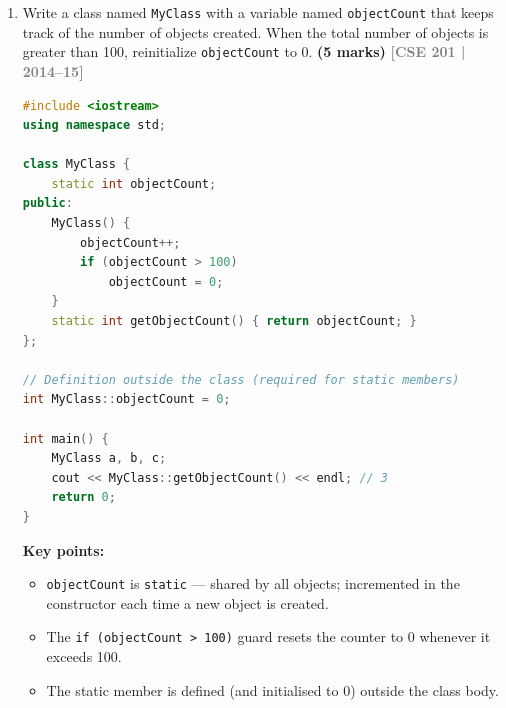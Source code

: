 \documentclass[12pt,a3paper]{article}
\newcommand{\yr}[1]{\hfill\textcolor{gray}{\small\textbf{[#1]}}}
\newcommand{\mk}[1]{\textcolor{orange!70!black}{\small\textbf{(#1 marks)}}}
\begin{document}
\begin{enumerate}
\begin{tcolorbox}[enhanced,breakable,ansbox,colback=cB!4,colframe=cB,
  boxrule=0.8pt,arc=5pt,
  title={\textbf{Answer}},fonttitle=\bfseries\color{white},colbacktitle=cB]
\textbf{Rules for static methods:}
\begin{itemize}[itemsep=2pt]
  \item Can access only \emph{static} members (no access to
    \texttt{this} pointer or non-static members).
  \item Can be called without creating an object:
    \texttt{ClassName::method()}.
  \item Cannot be \texttt{virtual} or \texttt{const}.
\end{itemize}

\begin{lstlisting}[language=C++]
class Counter {
    static int count;       // declaration
public:
    Counter()  { count++; }
    ~Counter() { count--; }
    static int getCount() { return count; } // static method
};
int Counter::count = 0;     // definition outside class
\end{lstlisting}

\end{tcolorbox}

\item Write a class named \texttt{MyClass} with a variable named \texttt{objectCount} that keeps track of the number of objects created. When the total number of objects is greater than 100, reinitialize \texttt{objectCount} to 0. \mk{5}
\yr{CSE 201 | 2014--15}

\begin{tcolorbox}[enhanced,breakable,ansbox,colback=cB!4,colframe=cB,
  boxrule=0.8pt,arc=5pt,
  title={\textbf{Answer}},fonttitle=\bfseries\color{white},colbacktitle=cB]

\begin{lstlisting}[language=C++]
#include <iostream>
using namespace std;

class MyClass {
    static int objectCount;
public:
    MyClass() {
        objectCount++;
        if (objectCount > 100)
            objectCount = 0;
    }
    static int getObjectCount() { return objectCount; }
};

// Definition outside the class (required for static members)
int MyClass::objectCount = 0;

int main() {
    MyClass a, b, c;
    cout << MyClass::getObjectCount() << endl; // 3
    return 0;
}
\end{lstlisting}

\textbf{Key points:}
\begin{itemize}[itemsep=2pt]
  \item \texttt{objectCount} is \texttt{static} --- shared by all
    objects; incremented in the constructor each time a new object
    is created.
  \item The \texttt{if (objectCount > 100)} guard resets the counter
    to 0 whenever it exceeds 100.
  \item The static member is defined (and initialised to 0) outside
    the class body.
\end{itemize}


\end{tcolorbox}
\end{enumerate}
\end{document}
